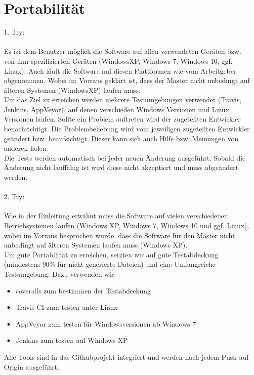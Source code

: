\documentclass[accentcolor=tud9c,12pt,paper=a4]{tudreport}
\begin{document}
		\section{Portabilität}
			1. Try:\\ \\
			Es ist dem Benutzer möglich die Software auf allen verwendeten
			Geräten bzw. von ihm spezifizierten Geräten (WindowsXP, Windows 7,
			Windows 10, ggf. Linux). Auch läuft die Software auf diesen
			Plattformen wie vom Arbeitgeber abgenommen. Wobei im Vorraus
			geklärt ist, dass der Master nicht unbedingt auf älteren Systemen
			(WindowsXP) laufen muss.
			\\
			Um das Ziel zu erreichen werden mehrere Testumgebungen verwendet
			(Travis, Jenkins, AppVeyor), auf denen verschieden Windows
			Versionen und Linux Versionen laufen. Sollte ein Problem auftreten
			wird der zugeteilten Entwickler benachrichtigt. Die Problembehebung
			wird vom jeweiligen zugeteilten Entwickler geändert bzw.
			beaufsichtigt. Dieser kann sich auch Hilfe bzw. Meinungen von
			anderen holen.
			\\
			Die Tests werden automatisch bei jeder neuen Änderung ausgeführt.
			Sobald die Änderung nicht lauffähig ist wird diese nicht akzeptiert
			und muss abgeändert werden.
			\\
			\\	
			2. Try:\\ \\
			Wie in der Einleitung erwähnt muss die Software auf vielen verschiedenen 
			Betriebsystemen laufen (Windows XP, Windows 7, Windows 10 und ggf. Linux),
			wobei im Vorraus besprochen wurde, dass die Software für den Master nicht 
			unbedingt auf älteren Systemen laufen muss (Windows XP).
			\\[5pt]
			Um gute Portabilität zu erreichen, setzten wir auf gute Testabdeckung 
			(mindestens 90\% für nicht generierte Dateien) und eine Umfangreiche 
			Testumgebung. Dazu verwenden wir:
			\begin{itemize}	
				\item coveralls zum bestimmen der Testabdeckung
				\item Travis CI zum testen unter Linux
				\item AppVeyor zum testen für Windowsversionen ab Windows 7
				\item Jenkins zum testen auf Windows XP
			\end{itemize}
			Alle Tools sind in das Githubprojekt integriert und werden nach jedem Push auf 
			Origin ausgeführt.
\end{document}
